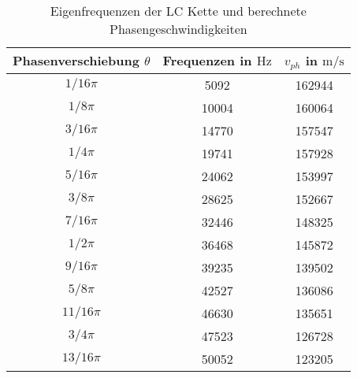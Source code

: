 \begin{table}
\centering
\caption{Eigenfrequenzen der LC Kette und berechnete Phasengeschwindigkeiten}
\label{tab: v_phase}
\begin{tabular}{S S S }
\toprule
{Phasenverschiebung $\theta$} & {Frequenzen in $\si{\hertz}$} & {$v_{ph}$ in $\si{\meter\per\second}$}  \\
\midrule
{${1}/{16}\pi$}  & 5092  & 162944\\
{${1}/{8}\pi$}  & 10004  & 160064\\
{${3}/{16}\pi$} & 14770  & 157547\\
{${1}/{4}\pi$}  & 19741  & 157928\\
{${5}/{16}\pi$}   & 24062  & 153997\\
{${3}/{8}\pi$}  & 28625  & 152667\\
{${7}/{16}\pi$} & 32446  & 148325\\
{${1}/{2}\pi$}  & 36468  & 145872\\
{${9}/{16}\pi$}  & 39235  & 139502\\
{${5}/{8}\pi$}  & 42527  & 136086\\
{${11}/{16}\pi$}  & 46630  & 135651\\
{${3}/{4}\pi$}  & 47523  & 126728\\
{${13}/{16}\pi$}  & 50052  & 123205\\
\bottomrule
\end{tabular}
\end{table}
